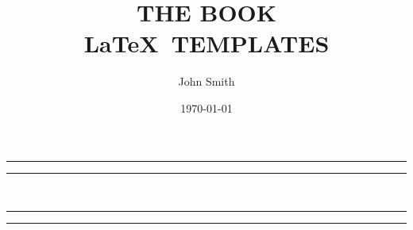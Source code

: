 \documentclass[openany,twoside,12pt]{book}
\title{THE BOOK \\[8pt] \LaTeX ~TEMPLATES}
\author{John Smith}
\date{\today}
\theoremstyle{plain}
\numberwithin{equation}{chapter}
\numberwithin{figure}{chapter}
\numberwithin{table}{chapter}
\begin{document}



\begin{titlepage} %
    
    
	\centering %
	
	\scshape %
	
	\vspace*{2\baselineskip} %
	
	
	\rule{\textwidth}{1.6pt}\vspace*{-\baselineskip}\vspace*{2pt} %
	\rule{\textwidth}{0.4pt} %
	
	\vspace{0.75\baselineskip} %
	
    \makeatletter
    
	{\LARGE\bfseries \@title \\} %
	
	\vspace{0.75\baselineskip} %
	
	\rule{\textwidth}{0.4pt}\vspace*{-\baselineskip}\vspace{3.2pt} %
	\rule{\textwidth}{1.6pt} %
	
	\vspace{2\baselineskip} %
	
	

	
	\vspace*{3\baselineskip} %
	

\end{titlepage}
\end{document}
